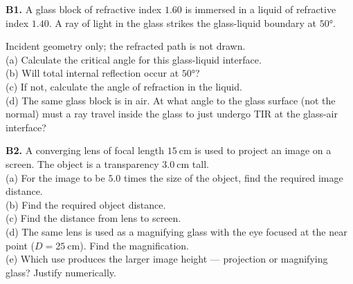 \begin{exercisebox}[20]
\textbf{B1.} A glass block of refractive index
$1.60$ is immersed in a liquid of refractive index
$1.40$. A ray of light in the glass strikes the
glass-liquid boundary at $50°$.\\[4pt]
\begin{center}
\end{center}
\small Incident geometry only; the refracted path is not drawn.\\[4pt]
(a) Calculate the critical angle for this
glass-liquid interface.\\
(b) Will total internal reflection occur at $50°$?\\
(c) If not, calculate the angle of refraction in
the liquid.\\
(d) The same glass block is in air. At what angle
to the glass surface (not the normal) must a ray
travel inside the glass to just undergo TIR at the
glass-air interface?
\hfill{}

\vspace{0.4cm}

\textbf{B2.} A converging lens of focal length
$15\ \text{cm}$ is used to project an image on a
screen. The object is a transparency $3.0\ \text{cm}$
tall.\\[4pt]
(a) For the image to be $5.0$ times the size of the
object, find the required image distance.\\
(b) Find the required object distance.\\
(c) Find the distance from lens to screen.\\
(d) The same lens is used as a magnifying glass
with the eye focused at the near point
($D = 25\ \text{cm}$). Find the magnification.\\
(e) Which use produces the larger image height
--- projection or magnifying glass? Justify
numerically.
\hfill{}


\end{exercisebox}
